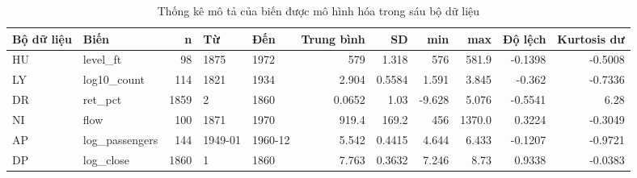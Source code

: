 \begin{table}[H]
\centering\scriptsize
\caption{Thống kê mô tả của biến được mô hình hóa trong sáu bộ dữ liệu}\label{tab:tab_eda_descriptive}
\begin{adjustbox}{max width=\linewidth}
\begin{tabular}{|l|l|r|l|l|r|r|r|r|r|r|}
\toprule
Bộ dữ liệu & Biến & n & Từ & Đến & Trung bình & SD & min & max & Độ lệch & Kurtosis dư \\
\midrule
HU & level\_ft & 98 & 1875 & 1972 & 579 & 1.318 & 576 & 581.9 & -0.1398 & -0.5008 \\
LY & log10\_count & 114 & 1821 & 1934 & 2.904 & 0.5584 & 1.591 & 3.845 & -0.362 & -0.7336 \\
DR & ret\_pct & 1859 & 2 & 1860 & 0.0652 & 1.03 & -9.628 & 5.076 & -0.5541 & 6.28 \\
NI & flow & 100 & 1871 & 1970 & 919.4 & 169.2 & 456 & 1370.0 & 0.3224 & -0.3049 \\
AP & log\_passengers & 144 & 1949-01 & 1960-12 & 5.542 & 0.4415 & 4.644 & 6.433 & -0.1207 & -0.9721 \\
DP & log\_close & 1860 & 1 & 1860 & 7.763 & 0.3632 & 7.246 & 8.73 & 0.9338 & -0.0383 \\
\bottomrule
\end{tabular}
\end{adjustbox}\par{}
\end{table}
